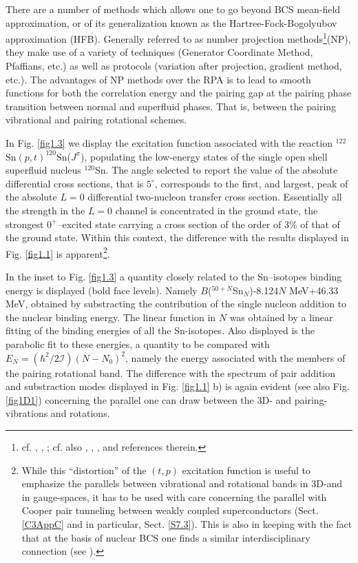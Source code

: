   
  There are a number of methods which allows one to go beyond BCS mean-field approximation, or of its generalization known as the Hartree-Fock-Bogolyubov approximation (HFB). Generally referred to as number projection methods\footnote{cf. \cite{Ring:80}, \cite{Egido:13}, \cite{Robledo:13}; cf. also \cite{Frauendorf:13}, \cite{Ring:13}, \cite{Heenen:13}, and references therein.}(NP), they make use of a variety of techniques (Generator Coordinate Method, Pfaffians, etc.) as well as protocols (variation after projection, gradient method, etc.). The advantages of NP methods over the RPA is to lead to smooth functions for both the correlation energy and the pairing gap at the pairing phase transition between normal and superfluid phases. That is, between the pairing vibrational and pairing rotational schemes.
  
  In Fig. \ref{fig1.3} we display the excitation function associated with the reaction $^{122}$Sn$(p,t)^{120}$Sn($J^\pi$), populating the low-energy states of the single open shell  superfluid nucleus $^{120}$Sn. The angle selected to report the value of the absolute differential cross sections, that is $5^\circ$, corresponds to the first, and largest, peak of the absolute $L=0$ differential two-nucleon transfer cross section. Essentially all the strength in the $L=0$ channel is concentrated in the ground state, the strongest $0^+$--excited state carrying a cross section of the order of 3\% of that of the ground state. Within this context, the difference with the results displayed in Fig. \ref{fig1.1} is apparent\footnote{\label{f19} While this ``distortion'' of the $(t,p)$ excitation function is useful to emphasize the parallels between vibrational and rotational bands in 3D-and in gauge-spaces, it has to be used with care concerning the parallel with Cooper pair tunneling between weakly coupled superconductors (Sect. \ref{C3AppC} and in particular, Sect. \ref{S7.3}). This is also in keeping with the fact that at the basis of nuclear BCS one finds a similar interdisciplinary connection (see \cite{Bohr:58}).}.
  
  In the inset to Fig. \ref{fig1.3} a quantity closely related to the Sn--isotopes binding energy is displayed (bold face levels). Namely $B$($^{50+N}$Sn$_N$)-8.124$N$ MeV+46.33 MeV, obtained by substracting the contribution of the single nucleon addition to the nuclear binding energy. The linear function in $N$ was obtained by a linear fitting of the binding energies of all the Sn-isotopes. 
  Also displayed is the parabolic fit to these energies, a quantity to be compared with $E_N=(\hbar^2/2\mathcal I)(N-N_0)^2$, namely the energy associated with the members of the pairing rotational band. The difference with the spectrum of pair addition and substraction modes displayed in Fig. \ref{fig1.1} b) is again evident (see also Fig. \ref{fig1D1}) concerning the parallel one can draw between the 3D- and pairing-vibrations and rotations.
  
